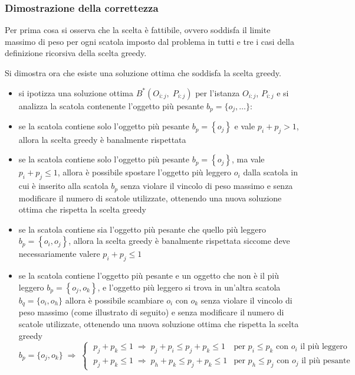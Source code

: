 \subsubsection*{Dimostrazione della correttezza}
Per prima cosa si osserva che la scelta è fattibile, ovvero soddisfa il limite massimo di peso per ogni scatola imposto
dal problema in tutti e tre i casi della definizione ricorsiva della scelta greedy.

Si dimostra ora che esiste una soluzione ottima che soddisfa la scelta greedy.
\begin{itemize}
	\item si ipotizza una soluzione ottima \(B^*(O_{i:j}, \; P_{i:j})\) per l'istanza \(O_{i:j}\), \(P_{i:j}\) e si analizza
	la scatola contenente l'oggetto più pesante \(b_p = \{o_j, \dots\}\):
	\item se la scatola contiene solo l'oggetto più pesante \(b_p = \left\{o_j\right\}\) e vale \(p_i + p_j > 1\), allora
	la scelta greedy è banalmente rispettata
	\item se la scatola contiene solo l'oggetto più pesante \(b_p = \left\{o_j\right\}\), ma vale \(p_i + p_j \leq 1\),
	allora è possibile spostare l'oggetto più leggero \(o_i\) dalla scatola in cui è inserito alla scatola \(b_p\) senza
	violare il vincolo di peso massimo e senza modificare il numero di scatole utilizzate, ottenendo una nuova soluzione
	ottima che rispetta la scelta greedy
	\item se la scatola contiene sia l'oggetto più pesante che quello più leggero \(b_p = \left\{o_i, o_j\right\}\), allora
	la scelta greedy è banalmente rispettata siccome deve necessariamente valere \(p_i + p_j \leq 1\)
	\item se la scatola contiene l'oggetto più pesante e un oggetto che non è il più leggero \(b_p = \left\{ o_j, o_k \right\}\),
	e l'oggetto più leggero si trova in un'altra scatola \(b_q = \{o_i, o_h\}\) allora è possibile scambiare \(o_i\) con \(o_k\)
	senza violare il vincolo di peso massimo (come illustrato di seguito) e senza modificare il numero di scatole utilizzate,
	ottenendo una nuova soluzione ottima che rispetta la scelta greedy
	\[b_p = \{ o_j, o_k\} \;\Rightarrow\; \begin{cases}
		\; p_j + p_k \leq 1 \;\Rightarrow\; p_j + p_i \leq p_j + p_k \leq 1 & \text{per } p_i \leq p_k \text{ con } o_i \text{ il più leggero} \\
		\; p_j + p_k \leq 1 \;\Rightarrow\; p_h + p_k \leq p_j + p_k \leq 1 & \text{per } p_h \leq p_j \text{ con } o_j \text{ il più pesante}
	\end{cases}\]
\end{itemize}
